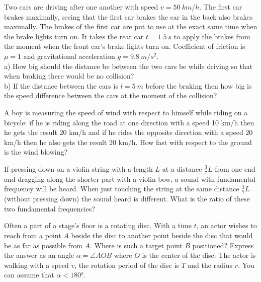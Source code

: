 \documentclass[11pt]{article}
\begin{document}

\probeng
Two cars are driving after one another with speed $v=\SI{50}{km/h}$. The first car brakes maximally, seeing that the first car brakes the car in the back also brakes maximally. The brakes of the first car are put to use at the exact same time when the brake lights turn on. It takes the rear car $t=\SI{1,5}{s}$ to apply the brakes from the moment when the front car’s brake lights turn on. Coefficient of friction is $\mu=1$ and gravitational acceleration $g=\SI{9,8}{m/s^2}$.\\
a) How big should the distance be between the two cars be while driving so that when braking there would be no collision?\\
b) If the distance between the cars is $l=\SI{5}{m}$ before the braking then how big is the speed difference between the cars at the moment of the collision?
\probend
\bigskip


\probeng
A boy is measuring the speed of wind with respect to himself while riding on a bicycle: if he is riding along the road at one direction with a speed 10 km/h then he gets the result 20 km/h and if he rides the opposite direction with a speed 20 km/h then he also gets the result 20 km/h. How fast with respect to the ground is the wind blowing?
\probend
\bigskip


\probeng
If pressing down on a violin string with a length $L$ at a distance $\frac{3}{7}L$ from one end and dragging along the shorter part with a violin bow, a sound with fundamental frequency will be heard. When just touching the string at the same distance $\frac{3}{7}L$ (without pressing down) the sound heard is different. What is the ratio of these two fundamental frequencies?
\probend
\bigskip


\probeng
Often a part of a stage’s floor is a rotating disc. With a time $t$, an actor wishes to reach from a point $A$ beside the disc to another point beside the disc that would be as far as possible from $A$.  Where is such a target point $B$ positioned? Express the answer as an angle $\alpha = \angle \mathit{AOB}$ where $O$ is the center of the disc. The actor is walking with a speed $v$, the rotation period of the disc is $T$ and the radius $r$. You can assume that $\alpha < \ang{180}$.
\probend
\bigskip
\end{document}

